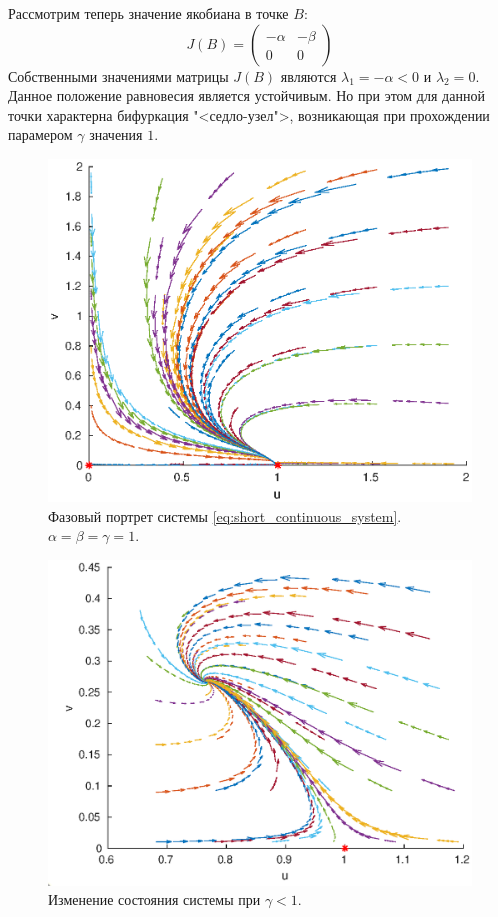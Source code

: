 Рассмотрим теперь значение якобиана в точке $B$:
$$
        J(B) =
        \begin{pmatrix}
                -\alpha & -\beta\\
                0 & 0
        \end{pmatrix}
$$
Собственными значениями матрицы $J(B)$ являются $\lambda_1 = -\alpha < 0$ и $\lambda_2 = 0$. Данное положение равновесия является устойчивым. Но при этом для данной точки характерна бифуркация "<седло-узел">, возникающая при прохождении парамером $\gamma$ значения $1$.

\begin{figure}[h]
        \centering
        \includegraphics[width=0.8\linewidth]{continuous_system/stability_of_fixed_points/common.eps}
        \caption{Фазовый портрет системы \ref{eq:short_continuous_system}. $\alpha = \beta = \gamma = 1$.}
\end{figure}

\begin{figure}[h]
        \centering
        \includegraphics[width=0.8\linewidth]{continuous_system/stability_of_fixed_points/r0-5.eps}
        \caption{Изменение состояния системы при $\gamma < 1$.}
\end{figure}

